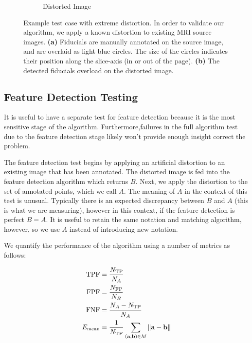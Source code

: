 \documentclass[12pt]{article}
\begin{document}
\begin{figure}
\begin{subfigure}[b]{0.48\textwidth}
        \caption{Distorted Image}
        \label{fig:test-case_2}
    \end{subfigure}
    \caption{Example test case with extreme distortion.  In order to validate our algorithm, we apply a known distortion to existing MRI source images. \textbf{(a)} Fiducials are manually annotated on the source image, and are overlaid as light blue circles.  The size of the circles indicates their position along the slice-axis (in or out of the page).  \textbf{(b)} The detected fiducials overload on the distorted image.}
    \label{fig:test-case}
\end{figure}

\subsection{Feature Detection Testing}

It is useful to have a separate test for feature detection because it is the most sensitive stage of the algorithm.  Furthermore,failures in the full algorithm test due to the feature detection stage likely won't provide enough insight correct the problem.

The feature detection test begins by applying an artificial distortion to an existing image that has been annotated.  The distorted image is fed into the feature detection algorithm which returns $B$.  Next, we apply the distortion to the set of annotated points, which we call $A$.  The meaning of $A$ in the context of this test is unusual.  Typically there is an expected discrepancy between $B$ and $A$ (this is what we are measuring), however in this context, if the feature detection is perfect $B = A$.  It is useful to retain the same notation and matching algorithm, however, so we use $A$ instead of introducing new notation.

We quantify the performance of the algorithm using a number of metrics as follows:

$$
\begin{align*}
    \textrm{TPF} &= \frac{N_\textrm{TP}}{N_A} \\
    \textrm{FPF} &= \frac{N_\textrm{FP}}{N_B} \\
    \textrm{FNF} &= \frac{N_A - N_\textrm{TP}}{N_A} \\
    E_\textrm{mean} &= \frac{1}{N_\textrm{TP}} \sum_{(\textbf{a}, \textbf{b}) \in M} \| \textbf{a} - \textbf{b} \|\\
\end{align*} \\
$$
\end{document}
